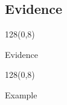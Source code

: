 \documentclass[shownotes]{beamer}
\begin{document}
\subsection{Evidence}

\begin{frame}
\begin{textblock}{128}(0,8)
\begin{center}
 \large Evidence
\end{center}
\end{textblock}
\vspace{1cm}
 
 
\end{frame}


\begin{frame}
\begin{textblock}{128}(0,8)
\begin{center}
 \large Example
\end{center}
\end{textblock}
\vspace{0.75cm}





\end{frame}
\end{document}
